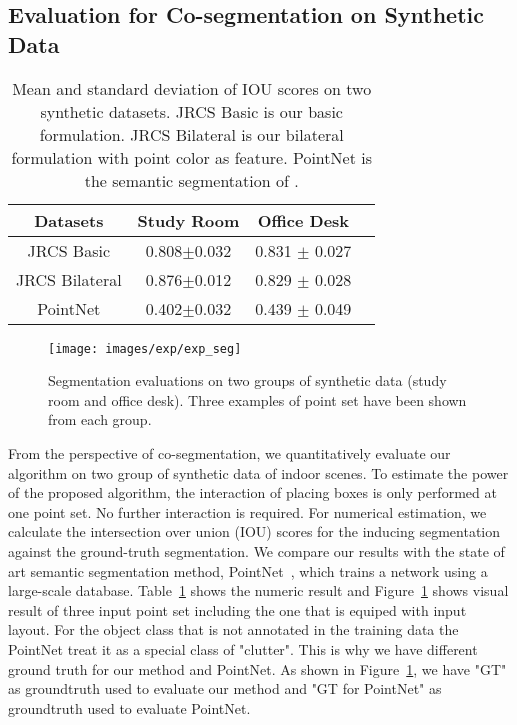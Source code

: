 \subsection{Evaluation for Co-segmentation on Synthetic Data}
\begin{table}
	\centering
	\caption{Mean and standard deviation of IOU scores on two synthetic datasets. JRCS Basic is our basic formulation. JRCS Bilateral  is our bilateral formulation with point color as feature. PointNet is the semantic segmentation of \cite{qi2016pointnet}. }
	\begin{tabular}{c c c c}
		Datasets &  Study Room & Office Desk \\
		\hline
		JRCS Basic & 0.808$\pm$0.032 & 0.831 $\pm$ 0.027\\   
		JRCS Bilateral & 0.876$\pm$0.012 & 0.829 $\pm$ 0.028\\
		PointNet & 0.402$\pm$0.032 &  0.439 $\pm$ 0.049\\
	\end{tabular}
	\label{tab:seg}
\end{table}
\begin{figure}[htb]
	\centering
	\texttt{[image: images/exp/exp\_seg]}
	\caption{\label{fig:seg} Segmentation evaluations on two groups of synthetic data (study room and office desk). Three examples of point set have been shown from each group.}
\end{figure}
%
From the perspective of co-segmentation, we quantitatively evaluate our algorithm on two group of synthetic data of indoor scenes. 
%
To estimate the power of the proposed algorithm, the interaction of placing boxes is only performed at one point set. No further interaction is required. 
%
For numerical estimation, we calculate the intersection over union (IOU) scores for the inducing segmentation against the ground-truth segmentation.
% 
We compare our results with the state of art semantic segmentation method, PointNet~\cite{qi2016pointnet}, which trains a network using a large-scale database. 
%
Table~\ref{tab:seg} shows the numeric result and Figure~\ref{fig:seg} shows visual result of three input point set including the one that is equiped with input layout.
For the object class that is not annotated in the training data the PointNet treat it as a special class of "clutter". This is why we have different ground truth for our method and PointNet. As shown in Figure~\ref{fig:seg}, we have "GT" as groundtruth used to evaluate our method and "GT for PointNet" as groundtruth used to evaluate PointNet. 
